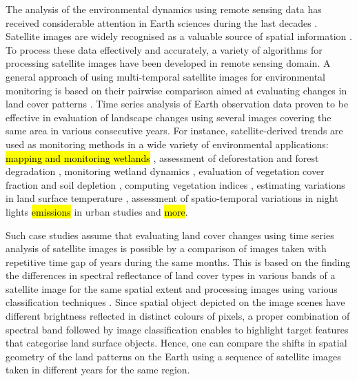 \documentclass[12pt,a4paper,oneside]{article}
\def \newpar{\vspace{6pt}}
\begin{document}
\newpar The analysis of the environmental dynamics using remote sensing data has received considerable attention in Earth sciences during the last decades \citep{SULTANA2023267,PAYRA2023239,MERTIKAS2021107}. Satellite images are widely recognised as a valuable source of spatial information \citep{Richards,Costel,Lerat}. To process these data effectively and accurately, a variety of algorithms for processing satellite images have been developed in remote sensing domain. A general approach of using multi-temporal satellite images for environmental monitoring is based on their pairwise comparison aimed at evaluating changes in land cover patterns \citep{OGILVIE2015368,Hiernaux}. Time series analysis of Earth observation data proven to be effective in evaluation of landscape changes using several images covering the same area in various consecutive years. For instance, satellite-derived trends are used as monitoring methods in a wide variety of environmental applications: \hl{mapping and monitoring wetlands} \cite{WU2018140}, assessment of deforestation and forest degradation \citep{MASOLELE2021112600,rs11242999,ijgi11110573,rs9090905}, monitoring wetland dynamics \citep{KOVACS2022113267,land11122137}, evaluation of vegetation cover fraction and soil depletion \cite{DUBE2017112,rs15010020}, computing vegetation indices \citep{VENTER2020106206,app122412554,f13122066}, estimating variations in land surface temperature \citep{CARRILLONIQUETE2022104280}, assessment of spatio-temporal variations in night lights \hl{emissions} in urban studies \citep{Rehman} and \hl{more}. 

\newpar Such case studies assume that evaluating land cover changes using time series analysis of satellite images is possible by a comparison of images taken with repetitive time gap of years during the same months. This is based on the finding the differences in spectral reflectance of land cover types in various bands of a satellite image for the same spatial extent and processing images using various classification techniques \citep{SHAHI202385,MERRY2023269,GANDHI201681}. Since spatial object depicted on the image scenes have different brightness reflected in distinct colours of pixels, a proper combination of spectral band followed by image classification enables to highlight target features that categorise land surface objects. Hence, one can compare the shifts in spatial geometry of the land patterns on the Earth using a sequence of satellite images taken in different years for the same region. 
\end{document}

